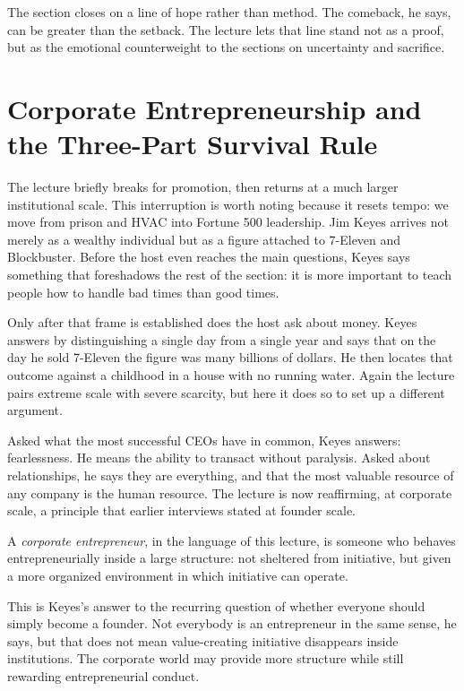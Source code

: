 The section closes on a line of hope rather than method. The comeback, he says, can be greater than the setback. The lecture lets that line stand not as a proof, but as the emotional counterweight to the sections on uncertainty and sacrifice.

\section{Corporate Entrepreneurship and the Three-Part Survival Rule}

The lecture briefly breaks for promotion, then returns at a much larger institutional scale. This interruption is worth noting because it resets tempo: we move from prison and HVAC into Fortune 500 leadership. Jim Keyes arrives not merely as a wealthy individual but as a figure attached to 7-Eleven and Blockbuster. Before the host even reaches the main questions, Keyes says something that foreshadows the rest of the section: it is more important to teach people how to handle bad times than good times.

Only after that frame is established does the host ask about money. Keyes answers by distinguishing a single day from a single year and says that on the day he sold 7-Eleven the figure was many billions of dollars. He then locates that outcome against a childhood in a house with no running water. Again the lecture pairs extreme scale with severe scarcity, but here it does so to set up a different argument.

Asked what the most successful CEOs have in common, Keyes answers: fearlessness. He means the ability to transact without paralysis. Asked about relationships, he says they are everything, and that the most valuable resource of any company is the human resource. The lecture is now reaffirming, at corporate scale, a principle that earlier interviews stated at founder scale.

\begin{definition}
A \emph{corporate entrepreneur}, in the language of this lecture, is someone who behaves entrepreneurially inside a large structure: not sheltered from initiative, but given a more organized environment in which initiative can operate.
\end{definition}

This is Keyes's answer to the recurring question of whether everyone should simply become a founder. Not everybody is an entrepreneur in the same sense, he says, but that does not mean value-creating initiative disappears inside institutions. The corporate world may provide more structure while still rewarding entrepreneurial conduct.

